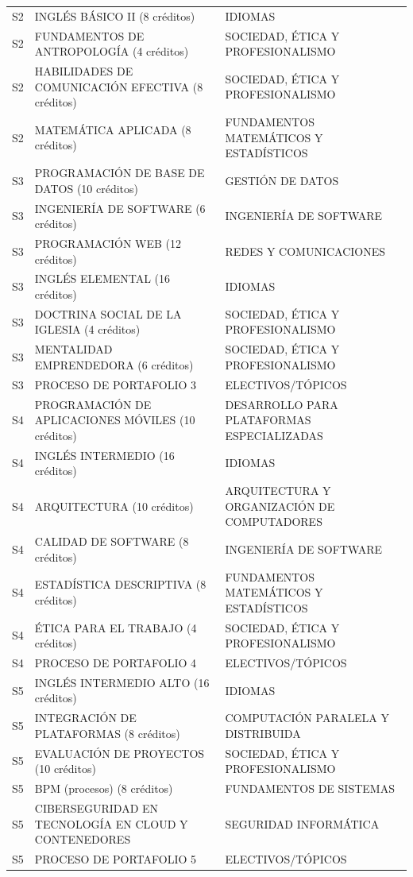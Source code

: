 \documentclass[11pt,a4paper]{article}
\begin{document}
\begin{small}
\begin{longtable}{c >{\raggedright\arraybackslash}p{8.5cm} >{\raggedright\arraybackslash}p{5.5cm}}
S2 & INGLÉS BÁSICO II (8 créditos) & IDIOMAS \\
S2 & FUNDAMENTOS DE ANTROPOLOGÍA (4 créditos) & SOCIEDAD, ÉTICA Y PROFESIONALISMO \\
S2 & HABILIDADES DE COMUNICACIÓN EFECTIVA (8 créditos) & SOCIEDAD, ÉTICA Y PROFESIONALISMO \\
S2 & MATEMÁTICA APLICADA (8 créditos) & FUNDAMENTOS MATEMÁTICOS Y ESTADÍSTICOS \\
S3 & PROGRAMACIÓN DE BASE DE DATOS (10 créditos) & GESTIÓN DE DATOS \\
S3 & INGENIERÍA DE SOFTWARE (6 créditos) & INGENIERÍA DE SOFTWARE \\
S3 & PROGRAMACIÓN WEB (12 créditos) & REDES Y COMUNICACIONES \\
S3 & INGLÉS ELEMENTAL (16 créditos) & IDIOMAS \\
S3 & DOCTRINA SOCIAL DE LA IGLESIA (4 créditos) & SOCIEDAD, ÉTICA Y PROFESIONALISMO \\
S3 & MENTALIDAD EMPRENDEDORA (6 créditos) & SOCIEDAD, ÉTICA Y PROFESIONALISMO \\
S3 & PROCESO DE PORTAFOLIO 3 & ELECTIVOS/TÓPICOS \\
S4 & PROGRAMACIÓN DE APLICACIONES MÓVILES (10 créditos) & DESARROLLO PARA PLATAFORMAS ESPECIALIZADAS \\
S4 & INGLÉS INTERMEDIO (16 créditos) & IDIOMAS \\
S4 & ARQUITECTURA (10 créditos) & ARQUITECTURA Y ORGANIZACIÓN DE COMPUTADORES \\
S4 & CALIDAD DE SOFTWARE (8 créditos) & INGENIERÍA DE SOFTWARE \\
S4 & ESTADÍSTICA DESCRIPTIVA (8 créditos) & FUNDAMENTOS MATEMÁTICOS Y ESTADÍSTICOS \\
S4 & ÉTICA PARA EL TRABAJO (4 créditos) & SOCIEDAD, ÉTICA Y PROFESIONALISMO \\
S4 & PROCESO DE PORTAFOLIO 4 & ELECTIVOS/TÓPICOS \\
S5 & INGLÉS INTERMEDIO ALTO (16 créditos) & IDIOMAS \\
S5 & INTEGRACIÓN DE PLATAFORMAS (8 créditos) & COMPUTACIÓN PARALELA Y DISTRIBUIDA \\
S5 & EVALUACIÓN DE PROYECTOS (10 créditos) & SOCIEDAD, ÉTICA Y PROFESIONALISMO \\
S5 & BPM (procesos) (8 créditos) & FUNDAMENTOS DE SISTEMAS \\
S5 & CIBERSEGURIDAD EN TECNOLOGÍA EN CLOUD Y CONTENEDORES & SEGURIDAD INFORMÁTICA \\
S5 & PROCESO DE PORTAFOLIO 5 & ELECTIVOS/TÓPICOS \\

\end{longtable}
\end{small}
\end{document}

